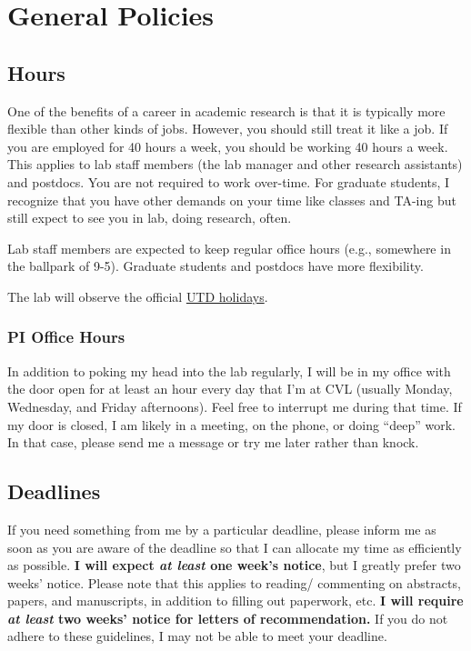 \documentclass[]{book}
\begin{document}
\hypertarget{general-policies}{%
\chapter{General Policies}\label{general-policies}}

\hypertarget{hours}{%
\section{Hours}\label{hours}}

One of the benefits of a career in academic research is that it is typically more flexible than other kinds of jobs. However, you should still treat it like a job. If you are employed for 40 hours a week, you should be working 40 hours a week. This applies to lab staff members (the lab manager and other research assistants) and postdocs. You are not required to work over-time. For graduate students, I recognize that you have other demands on your time like classes and TA-ing but still expect to see you in lab, doing research, often.

Lab staff members are expected to keep regular office hours (e.g., somewhere in the ballpark of 9-5). Graduate students and postdocs have more flexibility.

The lab will observe the official \href{https://www.utdallas.edu/hr/news/holidays/}{UTD holidays}.

\hypertarget{pi-office-hours}{%
\subsection{PI Office Hours}\label{pi-office-hours}}

In addition to poking my head into the lab regularly, I will be in my office with the door open for at least an hour every day that I'm at CVL (usually Monday, Wednesday, and Friday afternoons). Feel free to interrupt me during that time. If my door is closed, I am likely in a meeting, on the phone, or doing ``deep'' work. In that case, please send me a message or try me later rather than knock.

\hypertarget{deadlines}{%
\section{Deadlines}\label{deadlines}}

If you need something from me by a particular deadline, please inform me as soon as you are aware of the deadline so that I can allocate my time as efficiently as possible. \textbf{I will expect \emph{at least} one week's notice}, but I greatly prefer two weeks' notice. Please note that this applies to reading/ commenting on abstracts, papers, and manuscripts, in addition to filling out paperwork, etc. \textbf{I will require \emph{at least} two weeks' notice for letters of recommendation.} If you do not adhere to these guidelines, I may not be able to meet your deadline.
\end{document}
